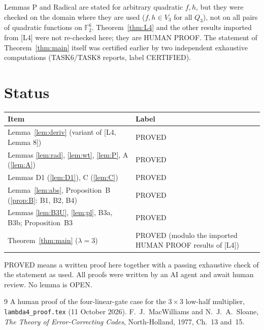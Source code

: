 \documentclass[11pt,a4paper]{article}
\theoremstyle{plain}
\theoremstyle{definition}
\theoremstyle{remark}
\newcommand{\F}{\mathbb{F}_2}
\begin{document}
Lemmas P and Radical are stated for arbitrary quadratic $f,h$, but they were checked on the domain where they are used ($f,h\in V_3$ for all $Q_3$), not on all pairs of quadratic functions on $\F^6$. Theorem~\ref{thm:L4} and the other results imported from [L4] were not re-checked here; they are HUMAN PROOF. The statement of Theorem~\ref{thm:main} itself was certified earlier by two independent exhaustive computations (TASK6/TASK8 reports, label CERTIFIED).

\section{Status}

\begin{center}
\begin{tabular}{@{}ll@{}}
\toprule
Item & Label \\
\midrule
Lemma~\ref{lem:deriv} (variant of [L4, Lemma 8]) & PROVED \\
Lemmas \ref{lem:rad}, \ref{lem:wt}, \ref{lem:P}, A (\ref{lem:A}) & PROVED \\
Lemmas D1 (\ref{lem:D1}), C (\ref{lem:C}) & PROVED \\
Lemma~\ref{lem:abs}, Proposition~B (\ref{prop:B}: B1, B2, B4) & PROVED \\
Lemmas \ref{lem:B3U}, \ref{lem:pl}, B3a, B3b; Proposition~B3 & PROVED \\
Theorem~\ref{thm:main} ($\lambda=3$) & PROVED (modulo the imported HUMAN PROOF results of [L4]) \\
\bottomrule
\end{tabular}
\end{center}

PROVED means a written proof here together with a passing exhaustive check of the statement as used. All proofs were written by an AI agent and await human review. No lemma is OPEN.

\begin{thebibliography}{9}
 A human proof of the four-linear-gate case for the $3\times3$ low-half multiplier, \texttt{lambda4\_proof.tex} (11 October 2026).
 F.~J.~MacWilliams and N.~J.~A.~Sloane, \emph{The Theory of Error-Correcting Codes}, North-Holland, 1977, Ch.~13 and~15.
\end{thebibliography}
\end{document}
